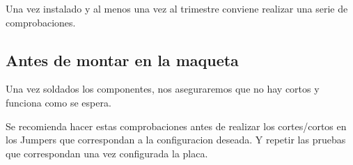 
Una vez instalado y al menos una vez al trimestre conviene realizar una serie de comprobaciones.

\subsection{Antes de montar en la maqueta}
Una vez soldados los componentes, nos aseguraremos que no hay cortos y funciona como se espera.

Se recomienda hacer estas comprobaciones antes de realizar los cortes/cortos en los Jumpers que correspondan a la configuracion deseada. Y repetir las pruebas que correspondan una vez configurada la placa.

